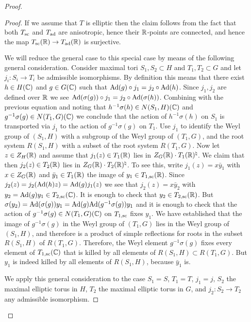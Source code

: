 \documentclass{article}
\theoremstyle{definition}
\numberwithin{equation}{section}
\renewcommand{\-}{\hyp{}}
\begin{document}
\begin{proof}
\begin{proof}
	If we assume that $T$ is elliptic then the claim follows from the fact that both $T_{\textrm{sc}}$ and $T_{\textrm{ad}}$ are anisotropic, hence their $\mathbb{R}$-points are connected, and hence the map $T_{\textrm{sc}}(\mathbb{R}) \to T_{\textrm{ad}}(\mathbb{R})$ is surjective.

	We will reduce the general case to this special case by means of the following general consideration. Consider maximal tori $S_1,S_2 \subset H$ and $T_1,T_2 \subset G$ and let $j_i : S_i \to T_i$ be admissible isomorphisms. By definition this means that there exist $h \in H(\mathbb{C})$ and $g \in G(\mathbb{C})$ such that $\textrm{Ad}(g)\circ j_1=j_2 \circ \textrm{Ad}(h)$. Since $j_1,j_2$ are defined over $\mathbb{R}$ we see $\textrm{Ad}(\sigma(g))\circ j_1=j_2 \circ \textrm{Ad}(\sigma(h))$. Combining with the previous equation and noting that $h^{-1}\sigma(h) \in N(S_1,H)(\mathbb{C})$ and $g^{-1}\sigma(g) \in N(T_1,G)(\mathbb{C})$ we conclude that the action of $h^{-1}\sigma(h)$ on $S_1$ is transported via $j_1$ to the action of $g^{-1}\sigma(g)$ on $T_1$. Use $j_1$ to identify the Weyl group of $(S_1,H)$ with a subgroup of the Weyl group of $(T_1,G)$, and the root system $R(S_1,H)$ with a subset of the root system $R(T_1,G)$. Now let $z \in Z_H(\mathbb{R})$ and assume that $j_1(z) \in T_1(\mathbb{R})$ lies in $Z_G(\mathbb{R})\cdot T_1(\mathbb{R})^\natural$. We claim that then $j_2(z) \in T_2(\mathbb{R})$ lies in $Z_G(\mathbb{R})\cdot T_2(\mathbb{R})^\natural$. To see this, write $j_1(z)=x\bar y_1$ with $x \in Z_G(\mathbb{R})$ and $\bar y_1 \in T_1(\mathbb{R})$ the image of $y_1 \in T_{1,\textrm{sc}}(\mathbb{R})$. Since $j_2(z)=j_2(\textrm{Ad}(h)z)=\textrm{Ad}(g)j_1(z)$ we see that $j_2(z)=x\bar y_2$ with $y_2 = \textrm{Ad}(g)y_1 \in T_{2,\textrm{sc}}(\mathbb{C})$. It is enough to check that $y_2 \in T_{2,\textrm{sc}}(\mathbb{R})$. But $\sigma(y_2)=\textrm{Ad}(\sigma(g))y_1=\textrm{Ad}(g)\textrm{Ad}(g^{-1}\sigma(g))y_1$ and it is enough to check that the action of $g^{-1}\sigma(g) \in N(T_1,G)(\mathbb{C})$ on $T_{1,\textrm{sc}}$ fixes $y_1$. We have established that the image of $g^{-1}\sigma(g)$ in the Weyl group of $(T_1,G)$ lies in the Weyl group of $(S_1,H)$, and therefore is a product of simple reflections for roots in the subset $R(S_1,H)$ of $R(T_1,G)$. Therefore, the Weyl element $g^{-1}\sigma(g)$ fixes every element of $T_{1,\textrm{sc}}(\mathbb{C})$ that is killed by all elements of $R(S_1,H) \subset R(T_1,G)$. But $y_1$ is indeed killed by all elements of $R(S_1,H)$, because $\bar y_1$ is.

	We apply this general consideration to the case $S_1=S$, $T_1=T$, $j_1=j$, $S_2$ the maximal elliptic torus in $H$, $T_2$ the maximal elliptic torus in $G$, and $j_2 : S_2 \to T_2$ any admissible isomorphism.
  \end{proof}


\end{proof}
\end{document}
